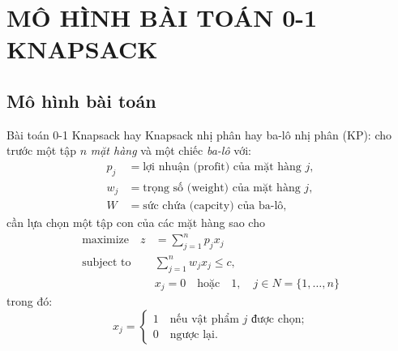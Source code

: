 \chapter{MÔ HÌNH BÀI TOÁN 0-1 KNAPSACK}


\section{Mô hình bài toán}

Bài toán 0-1 Knapsack hay Knapsack nhị phân hay ba-lô nhị phân (KP): cho trước một tập $n$ \emph{mặt hàng} và một chiếc \emph{ba-lô} với:
\begin{align}
    p_j &= \text{lợi nhuận (profit) của mặt hàng } j,\\
    w_j &= \text{trọng số (weight) của mặt hàng }j,\\
    W &= \text{sức chứa (capcity) của ba-lô},
\end{align}
cần lựa chọn một tập con của các mặt hàng sao cho
\begin{align}
    \label{eq:2.1}
    \text{maximize}\quad z &= \sum_{j =  1}^np_jx_j \\
    \label{eq:2.2}
    \text{subject to}\quad &\sum_{j=1}^nw_jx_j \leq c,\\
    \label{eq:2.3}
    & x_j = 0 \quad \text{hoặc} \quad 1,\quad j \in N = \{1, \dots, n\}
\end{align}
trong đó:
\begin{equation}
    x_j = \begin{cases}
        1\quad\text{nếu vật phẩm }j\text{ được chọn;}\\
        0\quad\text{ngược lại.}
    \end{cases}
\end{equation}


